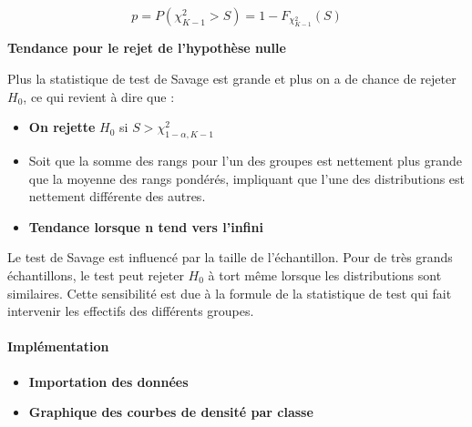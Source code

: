 \documentclass[
  12pt,
]{article}
\newenvironment{Shaded}{\begin{snugshade}}{\end{snugshade}}
\newcommand{\FunctionTok}[1]{\textcolor[rgb]{0.13,0.29,0.53}{\textbf{#1}}}
\newcommand{\NormalTok}[1]{#1}
\newcommand{\OtherTok}[1]{\textcolor[rgb]{0.56,0.35,0.01}{#1}}
\newcommand{\SpecialCharTok}[1]{\textcolor[rgb]{0.81,0.36,0.00}{\textbf{#1}}}
\newcommand{\StringTok}[1]{\textcolor[rgb]{0.31,0.60,0.02}{#1}}
\providecommand{\tightlist}{%
  \setlength{\itemsep}{0pt}\setlength{\parskip}{0pt}}
\begin{document}
\[p = P(\chi^2_{K-1} > S) = 1 - F_{\chi^2_{K-1}}(S)\]

\textbf{Tendance pour le rejet de l'hypothèse nulle}

Plus la statistique de test de Savage est grande et plus on a de chance
de rejeter \(H_0\), ce qui revient à dire que :

\begin{itemize}
\item
  \textbf{On rejette} \(H_0\) si \(S > \chi^2_{1-\alpha, K-1}\)
\item
  Soit que la somme des rangs pour l'un des groupes est nettement plus
  grande que la moyenne des rangs pondérés, impliquant que l'une des
  distributions est nettement différente des autres.
\item
  \textbf{Tendance lorsque n tend vers l'infini}
\end{itemize}

Le test de Savage est influencé par la taille de l'échantillon. Pour de
très grands échantillons, le test peut rejeter \(H_0\) à tort même
lorsque les distributions sont similaires. Cette sensibilité est due à
la formule de la statistique de test qui fait intervenir les effectifs
des différents groupes.

\paragraph{Implémentation}\label{impluxe9mentation}

\begin{itemize}
\tightlist
\item
  \textbf{Importation des données}
\end{itemize}

\begin{Shaded}
\end{Shaded}

\begin{itemize}
\tightlist
\item
  \textbf{Graphique des courbes de densité par classe}
\end{itemize}
\end{document}
